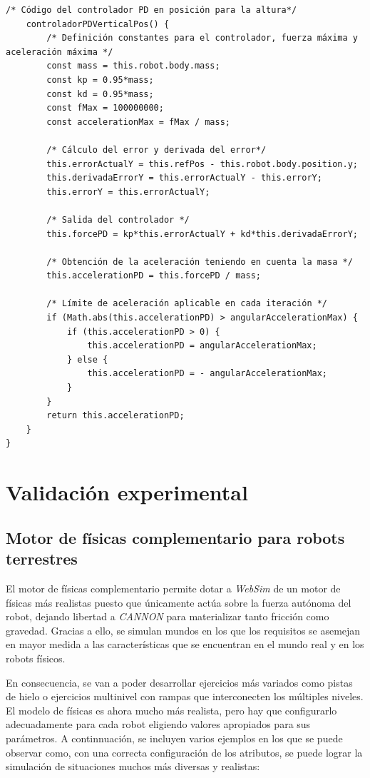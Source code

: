 \footnotesize {
\begin{verbatim}  
/* Código del controlador PD en posición para la altura*/
    controladorPDVerticalPos() {
        /* Definición constantes para el controlador, fuerza máxima y                   aceleración máxima */
        const mass = this.robot.body.mass;
        const kp = 0.95*mass;
        const kd = 0.95*mass;
        const fMax = 100000000;
        const accelerationMax = fMax / mass;

        /* Cálculo del error y derivada del error*/
        this.errorActualY = this.refPos - this.robot.body.position.y;
        this.derivadaErrorY = this.errorActualY - this.errorY;
        this.errorY = this.errorActualY;
        
        /* Salida del controlador */
        this.forcePD = kp*this.errorActualY + kd*this.derivadaErrorY;
        
        /* Obtención de la aceleración teniendo en cuenta la masa */
        this.accelerationPD = this.forcePD / mass;

        /* Límite de aceleración aplicable en cada iteración */
        if (Math.abs(this.accelerationPD) > angularAccelerationMax) {
            if (this.accelerationPD > 0) {
                this.accelerationPD = angularAccelerationMax;
            } else {
                this.accelerationPD = - angularAccelerationMax;
            }
        }
        return this.accelerationPD;
    }
}
\end{verbatim}
}

\normalsize
\section{Validación experimental}
\subsection{Motor de físicas complementario para robots terrestres}
El motor de físicas complementario permite dotar a \textit{WebSim} de un motor de físicas más realistas puesto que únicamente actúa sobre la fuerza autónoma del robot, dejando libertad a \textit{CANNON} para materializar tanto fricción como gravedad. Gracias a ello, se simulan mundos en los que los requisitos se asemejan en mayor medida a las características que se encuentran en el mundo real y en los robots físicos. \newline

En consecuencia, se van a poder desarrollar ejercicios más variados como pistas de hielo o ejercicios multinivel con rampas que interconecten los múltiples niveles. El modelo de físicas es ahora mucho más realista, pero hay que configurarlo adecuadamente para
cada robot eligiendo valores apropiados para sus parámetros. A continnuación, se incluyen varios ejemplos en los que se puede observar como, con una correcta configuración de los atributos, se puede lograr la simulación de situaciones muchos más diversas y realistas:

